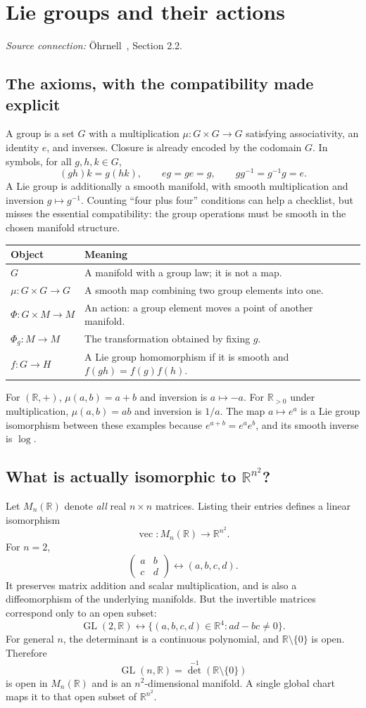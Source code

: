 \documentclass[11pt,a4paper]{article}
\numberwithin{equation}{section}
\theoremstyle{definition}
\theoremstyle{plain}
\theoremstyle{remark}
\newcommand{\R}{\mathbb R}
\newcommand{\GL}{\operatorname{GL}}
\newcommand{\source}[1]{\textit{Source connection:} \"Ohrnell~\cite{ohrnell}, #1.}
\begin{document}
\section{Lie groups and their actions}\label{sec:groups}
\source{Section 2.2}
\subsection{The axioms, with the compatibility made explicit}
A group is a set $G$ with a multiplication $\mu:G\times G\to G$ satisfying associativity, an identity $e$, and inverses. Closure is already encoded by the codomain $G$. In symbols, for all $g,h,k\in G$,
\[
(gh)k=g(hk),\qquad eg=ge=g,\qquad gg^{-1}=g^{-1}g=e.
\]
 A Lie group is additionally a smooth manifold, with smooth multiplication and inversion $g\mapsto g^{-1}$. Counting ``four plus four'' conditions can help a checklist, but misses the essential compatibility: the group operations must be smooth in the chosen manifold structure.

\begin{tabularx}{\linewidth}{@{}p{.27\linewidth}Y@{}}
\toprule Object & Meaning \\
\midrule $G$ & A manifold with a group law; it is not a map.\\
$\mu:G\times G\to G$ & A smooth map combining two group elements into one.\\
$\Phi:G\times M\to M$ & An action: a group element moves a point of another manifold.\\
$\Phi_g:M\to M$ & The transformation obtained by fixing $g$.\\
$f:G\to H$ & A Lie group homomorphism if it is smooth and $f(gh)=f(g)f(h)$.\\
\bottomrule
\end{tabularx}
For $(\R,+)$, $\mu(a,b)=a+b$ and inversion is $a\mapsto-a$. For $\R_{>0}$ under multiplication, $\mu(a,b)=ab$ and inversion is $1/a$. The map $a\mapsto e^a$ is a Lie group isomorphism between these examples because $e^{a+b}=e^ae^b$, and its smooth inverse is $\log$.

\subsection{What is actually isomorphic to \texorpdfstring{$\R^{n^2}$}{R to the n squared}?}\label{sec:gl}
Let $M_n(\R)$ denote \emph{all} real $n\times n$ matrices. Listing their entries defines a linear isomorphism
\[
\operatorname{vec}:M_n(\R)\longrightarrow\R^{n^2}.
\]
For $n=2$,
\[
\begin{pmatrix}a&b\\c&d\end{pmatrix}\longleftrightarrow(a,b,c,d).
\]
It preserves matrix addition and scalar multiplication, and is also a diffeomorphism of the underlying manifolds. But the invertible matrices correspond only to an open subset:
\[
\GL(2,\R)\longleftrightarrow
\{(a,b,c,d)\in\R^4:ad-bc\ne0\}.
\]
For general $n$, the determinant is a continuous polynomial, and $\R\setminus\{0\}$ is open. Therefore
\[
\GL(n,\R)=\det^{-1}(\R\setminus\{0\})
\]
is open in $M_n(\R)$ and is an $n^2$-dimensional manifold. A single global chart maps it to that open subset of $\R^{n^2}$.
\end{document}
